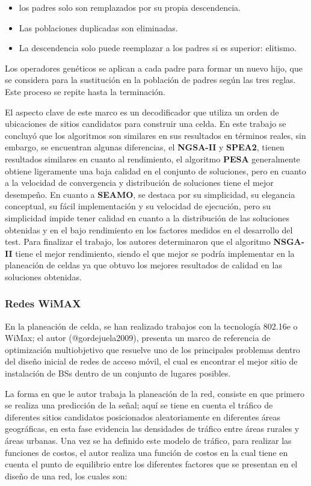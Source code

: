 \documentclass[]{article}
\begin{document}
\begin{itemize}
\item
  los padres solo son remplazados por su propia descendencia.
\item
  Las poblaciones duplicadas son eliminadas.
\item
  La descendencia solo puede reemplazar a los padres si es superior:
  elitismo.
\end{itemize}

Los operadores genéticos se aplican a cada padre para formar un nuevo
hijo, que se considera para la sustitución en la población de padres
según las tres reglas. Este proceso se repite hasta la terminación.

El aspecto clave de este marco es un decodificador que utiliza un orden
de ubicaciones de sitios candidatos para construir una celda. En este
trabajo se concluyó que los algoritmos son similares en sus resultados
en términos reales, sin embargo, se encuentran algunas diferencias, el
\textbf{NGSA-II} y \textbf{SPEA2}, tienen resultados similares en cuanto
al rendimiento, el algoritmo \textbf{PESA} generalmente obtiene
ligeramente una baja calidad en el conjunto de soluciones, pero en
cuanto a la velocidad de convergencia y distribución de soluciones tiene
el mejor desempeño. En cuanto a \textbf{SEAMO}, se destaca por su
simplicidad, su elegancia conceptual, su fácil implementación y su
velocidad de ejecución, pero su simplicidad impide tener calidad en
cuanto a la distribución de las soluciones obtenidas y en el bajo
rendimiento en los factores medidos en el desarrollo del test. Para
finalizar el trabajo, los autores determinaron que el algoritmo
\textbf{NSGA-II} tiene el mejor rendimiento, siendo el que mejor se
podría implementar en la planeación de celdas ya que obtuvo los mejores
resultados de calidad en las soluciones obtenidas.

\subsubsection{Redes WiMAX}\label{redes-wimax}

En la planeación de celda, se han realizado trabajos con la tecnología
802.16e o WiMax; el autor (@gordejuela2009), presenta un marco de
referencia de optimización multiobjetivo que resuelve uno de los
principales problemas dentro del diseño inicial de redes de acceso
móvil, el cual es encontrar el mejor sitio de instalación de BSs dentro
de un conjunto de lugares posibles.

La forma en que le autor trabaja la planeación de la red, consiste en
que primero se realiza una predicción de la señal; aquí se tiene en
cuenta el tráfico de diferentes sitios candidatos posicionados
aleatoriamente en diferentes áreas geográficas, en esta fase evidencia
las densidades de tráfico entre áreas rurales y áreas urbanas. Una vez
se ha definido este modelo de tráfico, para realizar las funciones de
costos, el autor realiza una función de costos en la cual tiene en
cuenta el punto de equilibrio entre los diferentes factores que se
presentan en el diseño de una red, los cuales son:
\end{document}
